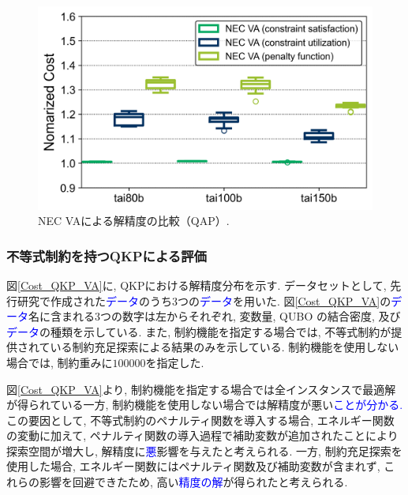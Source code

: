 \documentclass[submit,techrep,noauthor]{ipsj}
\begin{document}
\begin{figure}[tb]
\centering
\includegraphics[bb=0 0 700 230, width=15cm]{Cost_QAP_VA.png}
\caption{NEC VAによる解精度の比較（QAP）.}
\label{Cost_QAP_VA}
\end{figure}

\subsubsection{不等式制約を持つQKPによる評価}
図\ref{Cost_QKP_VA}に, QKPにおける解精度分布を示す. データセットとして, 先行研究で作成された\textcolor{blue}{データ}\cite{qkplib}のうち3つの\textcolor{blue}{データ}を用いた. 図\ref{Cost_QKP_VA}の\textcolor{blue}{データ}名に含まれる3つの数字は左からそれぞれ, 変数量, QUBO の結合密度, 及び\textcolor{blue}{データ}の種類を示している. また, 制約機能を指定する場合では, 不等式制約が提供されている制約充足探索による結果のみを示している. 制約機能を使用しない場合では, 制約重みに$100000$を指定した.

図\ref{Cost_QKP_VA}より, 制約機能を指定する場合では全インスタンスで最適解が得られている一方, 制約機能を使用しない場合では解精度が悪い\textcolor{blue}{ことが分かる.} この要因として, 不等式制約のペナルティ関数を導入する場合, エネルギー関数の変動に加えて, ペナルティ関数の導入過程で補助変数が追加されたことにより探索空間が増大し, 解精度に\textcolor{blue}{悪}影響を与えたと考えられる. 一方, 制約充足探索を使用した場合, エネルギー関数にはペナルティ関数及び補助変数が含まれず, これらの影響を回避できたため, 高い\textcolor{blue}{精度の解}が得られたと考えられる.
\end{document}
